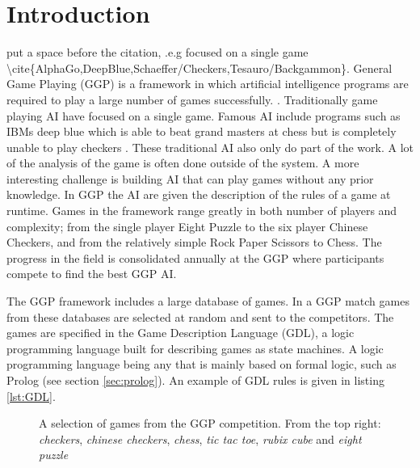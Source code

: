 \chapter{Introduction}\label{ch:intro}
\ac{put a space before the citation, .e.g focused on a single game \cite{AlphaGo,DeepBlue,Schaeffer/Checkers,Tesauro/Backgammon}.}
General Game Playing (GGP) is a framework in which artificial intelligence programs are required to play a large number of games successfully\ac{.} \cite{Genesereth/GGPOverview}.
Traditionally game playing AI have focused on a single game\cite{AlphaGo,DeepBlue,Schaeffer/Checkers,Tesauro/Backgammon}. Famous AI include programs such as IBMs deep blue which is able to beat grand masters at chess but is completely unable to play checkers \cite{DeepBlue}. These traditional AI also only do part of the work. A lot of the analysis of the game is often done outside of the system\cite{Schaeffer/Checkers}. A more interesting challenge is building AI that can play games without any prior knowledge. In GGP the AI are given the description of the rules of a game at runtime. Games in the framework range greatly in both number of players and complexity; from the single player Eight Puzzle to the six player Chinese Checkers, and from the relatively simple Rock Paper Scissors to Chess\cite{GGP-Website}. The progress in the field is consolidated annually at the GGP where participants compete to find the best GGP AI\cite{Genesereth/GGPOverview}.

The GGP framework includes a large database of games. In a GGP match games from these databases are selected at random and sent to the competitors\cite{Genesereth/GGPOverview}. The games are specified in the Game Description Language (GDL), a logic programming language built for describing games as state machines\cite{GDL_Spec}. A logic programming language being any that is mainly based on formal logic, such as Prolog (see section \ref{sec:prolog}). An example of GDL rules is given in listing \ref{lst:GDL}.


\begin{figure}[ht]
	\centering
	\caption{A selection of games from the GGP competition. From the top right: \textit{checkers}, \textit{chinese checkers}, \textit{chess}, \textit{tic tac toe}, \textit{rubix cube} and \textit{eight puzzle}}
\end{figure}



